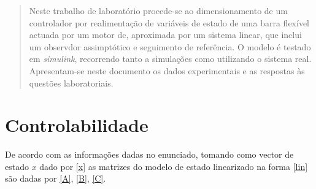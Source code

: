 \documentclass[%
  reprint,
  nofootinbib,
  amsmath,amssymb,
  aps,
  10pt,
  a4paper
]{revtex4-1}
\begin{document}
\begin{abstract}
Neste trabalho de laboratório procede-se ao dimensionamento de um controlador por realimentação de variáveis de estado de uma barra flexível actuada por um motor dc, aproximada por um sistema linear, que inclui um observdor assimptótico e seguimento de referência.
O modelo é testado em {\it simulink}, recorrendo tanto a simulações como utilizando o sistema real.
Apresentam-se neste documento os dados experimentais e as respostas às questões laboratoriais.
\end{abstract}
\maketitle


\section{Controlabilidade}

De acordo com as informações dadas no enunciado, tomando como vector de estado $x$ dado por \eqref{x} as matrizes do modelo de estado linearizado na forma \eqref{lin} são dadas por \eqref{A}, \eqref{B}, \eqref{C}.






\end{document}
